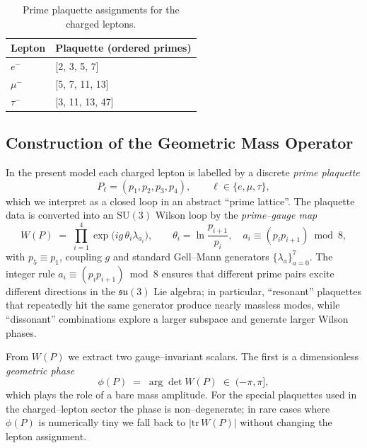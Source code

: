 \documentclass[12pt]{article}
\begin{document}
\begin{table}[ht]
\centering
\begin{tabular}{ll}
\toprule
Lepton & Plaquette (ordered primes) \\
\midrule
$e^-$   & [2, 3, 5, 7] \\
$\mu^-$ & [5, 7, 11, 13] \\
$\tau^-$& [3, 11, 13, 47] \\
\bottomrule
\end{tabular}
\caption{Prime plaquette assignments for the charged leptons.}
\label{tab:plaquettes-leptons}
\end{table}

\subsection{Construction of the Geometric Mass Operator}

In the present model each charged lepton is labelled by a discrete
\emph{prime plaquette}
\[
  P_\ell = (p_1,p_2,p_3,p_4), \qquad \ell \in \{e,\mu,\tau\},
\]
which we interpret as a closed loop in an abstract ``prime lattice''.
The plaquette data is converted into an $\mathrm{SU}(3)$ Wilson loop
by the \emph{prime--gauge map}
\begin{equation}
  W(P) \;=\; \prod_{i=1}^{4}
    \exp\!\bigl(i g\,\theta_i \lambda_{a_i}\bigr),
  \qquad
  \theta_i = \ln\frac{p_{i+1}}{p_i}, \quad
  a_i \equiv (p_i p_{i+1}) \bmod 8,
  \label{eq:prime-wilson}
\end{equation}
with $p_5 \equiv p_1$, coupling $g$ and standard Gell--Mann generators
$\{\lambda_a\}_{a=0}^{7}$.  The integer rule $a_i \equiv (p_i p_{i+1})
\bmod 8$ ensures that different prime pairs excite different directions
in the $\mathfrak{su}(3)$ Lie algebra; in particular, ``resonant''
plaquettes that repeatedly hit the same generator produce nearly
massless modes, while ``dissonant'' combinations explore a larger
subspace and generate larger Wilson phases.

From $W(P)$ we extract two gauge--invariant scalars.  The first is a
dimensionless \emph{geometric phase}
\begin{equation}
  \phi(P) \;=\; \arg\det W(P) \;\in\; (-\pi,\pi],
  \label{eq:geom-phase}
\end{equation}
which plays the role of a bare mass amplitude.  For the special
plaquettes used in the charged--lepton sector the phase is
non--degenerate; in rare cases where $\phi(P)$ is numerically tiny we
fall back to $|\mathrm{tr}\,W(P)|$ without changing the lepton
assignment.
\end{document}
